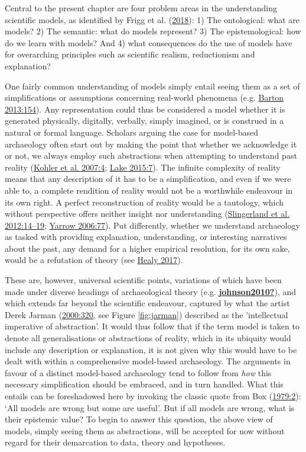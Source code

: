 \documentclass[
  a4paper,
  oneside]{uiophdthesis}
\begin{document}
Central to the present chapter are four problem areas in the understanding scientific models, as identified by Frigg et al. (\protect\hyperlink{ref-frigg2018}{2018}): 1) The ontological: what are models? 2) The semantic: what do models represent? 3) The epistemological: how do we learn with models? And 4) what consequences do the use of models have for overarching principles such as scientific realism, reductionism and explanation?

One fairly common understanding of models simply entail seeing them as a set of simplifications or assumptions concerning real-world phenomena (e.g. \protect\hyperlink{ref-barton2013}{Barton 2013:154}). Any representation could thus be considered a model whether it is generated physically, digitally, verbally, simply imagined, or is construed in a natural or formal language. Scholars arguing the case for model-based archaeology often start out by making the point that whether we acknowledge it or not, we always employ such abstractions when attempting to understand past reality (\protect\hyperlink{ref-kohler2007}{Kohler et al. 2007:4}; \protect\hyperlink{ref-lake2015}{Lake 2015:7}). The infinite complexity of reality means that any description of it has to be a simplification, and even if we were able to, a complete rendition of reality would not be a worthwhile endeavour in its own right. A perfect reconstruction of reality would be a tautology, which without perspective offers neither insight nor understanding (\protect\hyperlink{ref-slingerland2012}{Slingerland et al. 2012:14--19}; \protect\hyperlink{ref-yarrow2006}{Yarrow 2006:77}). Put differently, whether we understand archaeology as tasked with providing explanation, understanding, or interesting narratives about the past, any demand for a higher empirical resolution, for its own sake, would be a refutation of theory (see \protect\hyperlink{ref-healy2017}{Healy 2017}).

These are, however, universal scientific points, variations of which have been made under diverse headings of archaeological theory (e.g. \protect\hyperlink{ref-johnson2010}{\textbf{johnson2010?}}), and which extends far beyond the scientific endeavour, captured by what the artist Derek Jarman (\protect\hyperlink{ref-jarman2000}{2000:320}, see Figure \ref{fig:jarman}) described as the 'intellectual imperative of abstraction'. It would thus follow that if the term model is taken to denote all generalisations or abstractions of reality, which in its ubiquity would include any description or explanation, it is not given why this would have to be dealt with within a comprehensive model-based archaeology. The arguments in favour of a distinct model-based archaeology tend to follow from \emph{how} this necessary simplification should be embraced, and in turn handled. What this entails can be foreshadowed here by invoking the classic quote from Box (\protect\hyperlink{ref-box1979}{1979:2}): `All models are wrong but some are useful'. But if all models are wrong, what is their epistemic value? To begin to answer this question, the above view of models, simply seeing them as abstractions, will be accepted for now without regard for their demarcation to data, theory and hypotheses.
\end{document}
